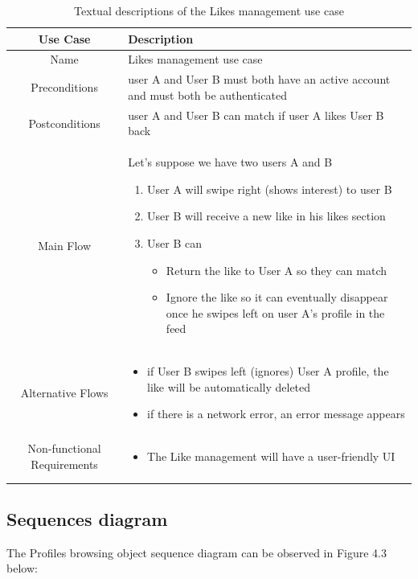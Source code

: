 \begin{longtable}{|c|p{10cm}|}
\hline
Use Case & Description \\\hline
Name & Likes management use case \\\hline
Preconditions & user A and User B must both have an active account and must both be authenticated \\\hline
Postconditions & user A and User B can match if user A likes User B back
\\\hline
Main Flow &
Let's suppose we have two users A and B
\begin{enumerate}
    \item User A will swipe right (shows interest) to user B
    \item User B will receive a new like in his likes section 
    \item User B can
       \begin{itemize}
        \item Return the like to User A so they can match
        \item Ignore the like so it can eventually disappear once he swipes left on user A's profile in the feed
    \end{itemize} 
\end{enumerate}
\\\hline
Alternative Flows & \begin{itemize}
    \item if User B swipes left (ignores) User A profile, the like will be automatically deleted
    \item if there is a network error, an error message appears
\end{itemize}
\\\hline
Non-functional Requirements & \begin{itemize}
    \item The Like management will have a user-friendly UI
\end{itemize}
\\\hline
\caption{Textual descriptions of the Likes management use case}
\label{Tab: Textual descriptions of the Likes management use case}
\end{longtable}

\subsection{Sequences diagram}
The Profiles browsing object sequence diagram can be observed in Figure 4.3 below:


